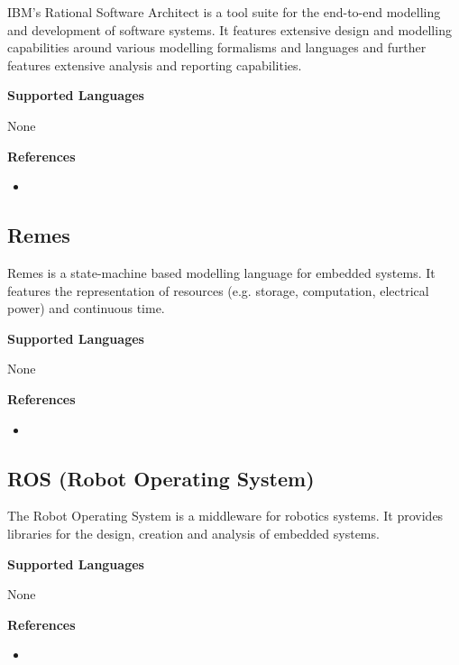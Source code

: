 IBM's Rational Software Architect is a tool suite for the end-to-end modelling and development of software systems. It features extensive design and modelling capabilities around various modelling formalisms and languages and further features extensive analysis and reporting capabilities.

\textbf{Supported Languages}

None


\textbf{References}
\begin{itemize}
	
\item {}
\end{itemize}



\subsection{Remes}
\label{subsecT:Remes}


Remes is a state-machine based modelling language for embedded systems.
It features the representation of resources (e.g. storage, computation, electrical power) and continuous time.

\textbf{Supported Languages}

None


\textbf{References}
\begin{itemize}
	
\item {}
\end{itemize}



\subsection{ROS (Robot Operating System)}
\label{subsecT:ROS}


The Robot Operating System is a middleware for robotics systems.  It provides libraries for the design, creation and analysis of embedded systems.

\textbf{Supported Languages}

None


\textbf{References}
\begin{itemize}
	
\item {}
\end{itemize}



